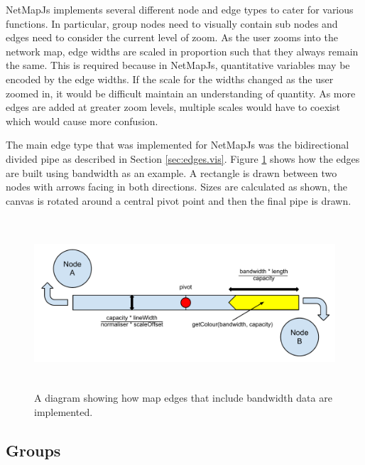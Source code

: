 \documentclass[11pt, a4paper]{article}
\begin{document}
NetMapJs implements several different node and edge types to cater for various
functions. In particular, group nodes need to visually contain sub nodes and
edges need to consider the current level of zoom. As the user zooms into the
network map, edge widths are scaled in proportion such that they always remain
the same. This is required because in NetMapJs, quantitative variables may be
encoded by the edge widths. If the scale for the widths changed as the user
zoomed in, it would be difficult maintain an understanding of quantity. As more
edges are added at greater zoom levels, multiple scales would have to coexist
which would cause more confusion.

The main edge type that was implemented for NetMapJs was the bidirectional
divided pipe as described in Section \ref{sec:edges.vis}. Figure
\ref{fig:nodesedges1.0} shows how the edges are built using bandwidth as an
example. A rectangle is drawn between two nodes with arrows facing in both
directions. Sizes are calculated as shown, the canvas is rotated around a
central pivot point and then the final pipe is drawn.



\begin{figure}
\centering
\includegraphics[width=170mm,height=63.24mm]{assets/nodesedges1-0.pdf}
\caption{A diagram showing how map edges that include bandwidth data are implemented.}
\label{fig:nodesedges1.0}
\end{figure}


\subsection{Groups}
\label{sec:groups.impl}
\end{document}
